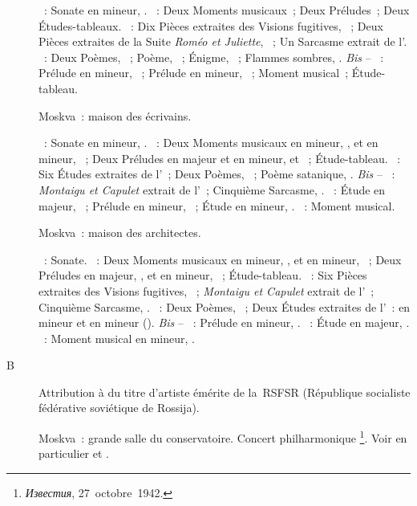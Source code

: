 \begin{description}
 \textsc{\Glazounov{}}~: Sonate en \kB \Flat mineur, .
 \textsc{\Rachmaninov{}}~: Deux Moments musicaux~; Deux Préludes~; Deux
 Études-tableaux.
 \textsc{\Prokofiev{}}~: Dix Pièces extraites des Visions fugitives,
 ~; Deux Pièces extraites de la Suite \emph{Roméo et Juliette},
 ~; Un Sarcasme extrait de l'.
 \textsc{\Scriabine{}}~: Deux Poèmes, ~; Poème, 
 ~; Énigme,  ~; Flammes sombres, 
 .
 \emph{Bis} -- \textsc{\Rachmaninov{}}~: Prélude en \kC \Sharp mineur,
  ~; Prélude en \kG \Sharp mineur,  ~;
 Moment musical~; Étude-tableau.
 \item[\DateWithWeekDay{1942-09-30}]
 Moskva~: maison des écrivains.

 \textsc{\Scriabine{}}~: Sonate en \kF \Sharp mineur, .
 \textsc{\Rachmaninov{}}~: Deux Moments musicaux en \kB mineur, 
 , et en \kE \Flat mineur,  ~; Deux Préludes en
 \kG majeur et en \kG \Sharp mineur,   et 
 ~; Étude-tableau.
 \textsc{\Scriabine{}}~: Six Études extraites de l'~; Deux Poèmes,
 ~; Poème satanique, .
 \emph{Bis} -- \textsc{\Prokofiev{}}~: \emph{Montaigu et Capulet} extrait de
 l'~; Cinquième Sarcasme,  .
 \textsc{\Scriabine{}}~: Étude en \kD \Flat majeur,  ~;
 Prélude en \kE mineur,  ~; Étude en \kD \Sharp mineur,
  .
 \textsc{\Rachmaninov{}}~: Moment musical.
 \item[\DateWithWeekDay{1942-10-15}]
 Moskva~: maison des architectes.

 \textsc{\Glazounov{}}~: Sonate.
 \textsc{\Rachmaninov{}}~: Deux Moments musicaux en \kB mineur, 
 , et en \kE \Flat mineur,  ~; Deux Préludes en
 \kG majeur,  , et en \kG \Sharp mineur, 
 ~; Étude-tableau.
 \textsc{\Prokofiev{}}~: Six Pièces extraites des Visions fugitives,
 ~; \emph{Montaigu et Capulet} extrait de l'~; Cinquième
 Sarcasme,  .
 \textsc{\Scriabine{}}~: Deux Poèmes, ~; Deux Études extraites de
 l'~: en \kB \Flat mineur et en \kD \Sharp mineur ().
 \emph{Bis} -- \textsc{\Rachmaninov{}}~: Prélude en \kC \Sharp mineur,
  .
 \textsc{\Scriabine{}}~: Étude en \kD \Flat majeur,  .
 \textsc{\Rachmaninov{}}~: Moment musical en \kE \Flat mineur, 
 .
 \item[B\DateWithWeekDay{1942-10-27}]
 Attribution à \VSofronitsky{} du titre d'artiste émérite de la~RSFSR
 (République socialiste fédérative soviétique de Rossija).
 \item[\DateWithWeekDay{1942-10-31}]
 Moskva~: grande salle du conservatoire.
 Concert philharmonique%
 \footnote{\foreignlanguage{russian}{\emph{Известия}}, 27~octobre~1942.}.
 Voir en particulier \citet[p.~442]{Milshteyn82a} et
 \citet[p.~394]{Nikonovich08}.


\end{description}

